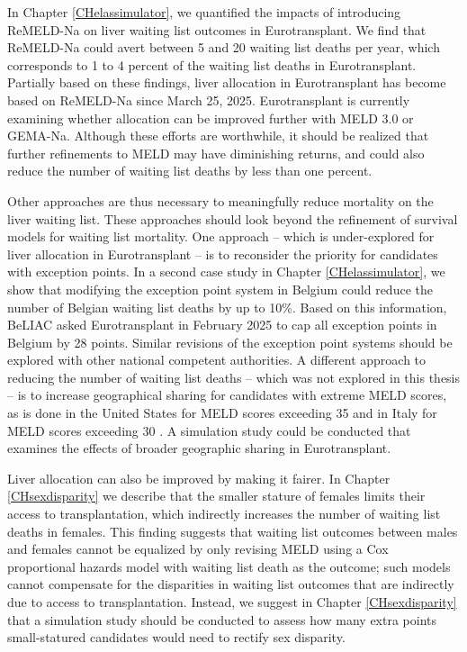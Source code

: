 \documentclass[11pt,twoside,]{book}
\begin{document}
In Chapter \ref{CHelassimulator}, we quantified the impacts of introducing
ReMELD-Na on liver waiting list outcomes in Eurotransplant. We find that ReMELD-Na
could avert between 5 and 20 waiting list deaths per year, which corresponds to 1 to 4
percent of the waiting list deaths in Eurotransplant. Partially based on these
findings, liver allocation in Eurotransplant has become based on ReMELD-Na since March 25, 2025.
Eurotransplant is currently examining whether allocation can be improved further with
MELD 3.0 or GEMA-Na. Although these efforts are worthwhile, it should be
realized that further refinements to MELD may have diminishing returns, and
could also reduce the number of waiting list deaths by less than one percent.

Other approaches are thus necessary to meaningfully reduce mortality on the
liver waiting list. These approaches should look beyond the refinement of survival
models for waiting list mortality. One approach -- which is under-explored for
liver allocation in Eurotransplant
-- is to reconsider the priority for candidates with exception points. In a second case
study in Chapter \ref{CHelassimulator}, we show that modifying the
exception point system in Belgium could reduce the number of Belgian waiting
list deaths by up to 10\%. Based on this information, BeLIAC asked
Eurotransplant in February 2025 to cap all exception points in Belgium by 28
points. Similar revisions of the exception point systems should be explored with
other national competent authorities. A different approach to reducing the number of
waiting list deaths -- which was not explored in this thesis --
is to increase geographical sharing for candidates with extreme MELD scores,
as is done in the United States for MELD scores exceeding 35 \citep{massieEarlyChangesLiver2015}
and in Italy for MELD scores exceeding 30 \citep{Ravaioli2022}. A
simulation study could be conducted that examines the effects of broader
geographic sharing in Eurotransplant.

Liver allocation can also be improved by making it fairer. In Chapter \ref{CHsexdisparity}
we describe that the smaller stature of females limits their access to
transplantation, which indirectly increases the number of waiting list deaths
in females. This finding suggests that waiting list outcomes between males and females cannot
be equalized by only revising MELD using a Cox proportional hazards model with
waiting list death as the outcome; such models cannot compensate for the
disparities in waiting list outcomes that are indirectly due to access to
transplantation. Instead, we suggest in Chapter \ref{CHsexdisparity}
that a simulation study should be conducted to assess how many
extra points small-statured candidates would need to rectify sex disparity.
\end{document}
